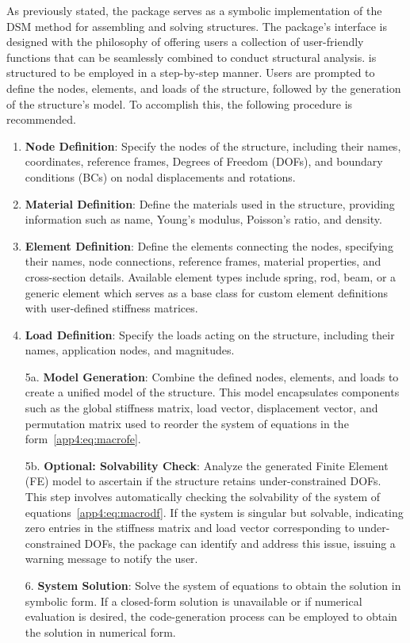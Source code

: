 As previously stated, the \TrussMe{} package serves as a symbolic implementation of the \ac{DSM} method for assembling and solving structures. The package's interface is designed with the philosophy of offering users a collection of user-friendly functions that can be seamlessly combined to conduct structural analysis. \TrussMe{} is structured to be employed in a step-by-step manner. Users are prompted to define the nodes, elements, and loads of the structure, followed by the generation of the structure's model. To accomplish this, the following procedure is recommended.
%
\begin{enumerate}
  \setlength{\itemsep}{0.0em}
  \item \textbf{Node Definition}: Specify the nodes of the structure, including their names, coordinates, reference frames, Degrees of Freedom (\acp{DOF}), and boundary conditions (\acp{BC}) on nodal displacements and rotations.
  \item \textbf{Material Definition}: Define the materials used in the structure, providing information such as name, Young's modulus, Poisson's ratio, and density.
  \item \textbf{Element Definition}: Define the elements connecting the nodes, specifying their names, node connections, reference frames, material properties, and cross-section details. Available element types include spring, rod, beam, or a generic element which serves as a base class for custom element definitions with user-defined stiffness matrices.
  \item \textbf{Load Definition}: Specify the loads acting on the structure, including their names, application nodes, and magnitudes.
  \item[5a.] \textbf{Model Generation}: Combine the defined nodes, elements, and loads to create a unified model of the structure. This model encapsulates components such as the global stiffness matrix, load vector, displacement vector, and permutation matrix used to reorder the system of equations in the form~\eqref{app4:eq:macrofe}.
  \item[5b.] \textbf{Optional: Solvability Check}: Analyze the generated Finite Element (FE) model to ascertain if the structure retains under-constrained \acp{DOF}. This step involves automatically checking the solvability of the system of equations~\eqref{app4:eq:macrodf}. If the system is singular but solvable, indicating zero entries in the stiffness matrix and load vector corresponding to under-constrained \acp{DOF}, the \TrussMe{} package can identify and address this issue, issuing a warning message to notify the user.
  \item[6.] \textbf{System Solution}: Solve the system of equations to obtain the solution in symbolic form. If a closed-form solution is unavailable or if numerical evaluation is desired, the code-generation process can be employed to obtain the solution in numerical form.
\end{enumerate}

